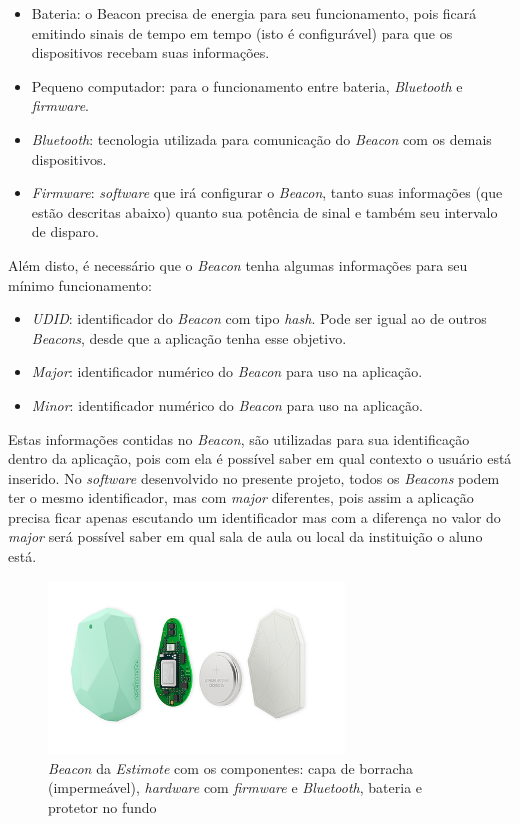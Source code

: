 \documentclass[
	12pt,
	oneside,
	a4paper,
	english,
	brazil,
]{abntex2}
\begin{document}
\begin{itemize}
    \item Bateria: o Beacon precisa de energia para seu funcionamento, pois ficará emitindo sinais de tempo em tempo (isto é configurável) para que os dispositivos recebam suas informações.
    \item Pequeno computador: para o funcionamento entre bateria, \emph{Bluetooth} e \emph{firmware}.
    \item \emph{Bluetooth}: tecnologia utilizada para comunicação do \emph{Beacon} com os demais dispositivos.
    \item \emph{Firmware}: \emph{software} que irá configurar o \emph{Beacon}, tanto suas informações (que estão descritas abaixo) quanto sua potência de sinal e também seu intervalo de disparo.
\end{itemize}

Além disto, é necessário que o \emph{Beacon} tenha algumas informações para seu mínimo funcionamento:

\begin{itemize}
    \item \emph{UDID}: identificador do \emph{Beacon} com tipo \emph{hash}. Pode ser igual ao de outros \emph{Beacons}, desde que a aplicação tenha esse objetivo.
    \item \emph{Major}: identificador numérico do \emph{Beacon} para uso na aplicação.
    \item \emph{Minor}: identificador numérico do \emph{Beacon} para uso na aplicação.
\end{itemize}

Estas informações contidas no \emph{Beacon}, são utilizadas para sua identificação dentro da aplicação, pois com ela é possível saber em qual contexto o usuário está inserido. No \emph{software} desenvolvido no presente projeto, todos os \emph{Beacons} podem ter o mesmo identificador, mas com \emph{major} diferentes, pois assim a aplicação precisa ficar apenas escutando um identificador mas com a diferença no valor do \emph{major} será possível saber em qual sala de aula ou local da instituição o aluno está.

\begin{figure}[h]
\centering
\includegraphics[width=0.7\textwidth]{estimote-beacon}
    \caption{
        \emph{Beacon} da \emph{Estimote} com os componentes: capa de borracha (impermeável), \emph{hardware} com \emph{firmware} e \emph{Bluetooth}, bateria e protetor no fundo
    }
\end{figure}
\end{document}
